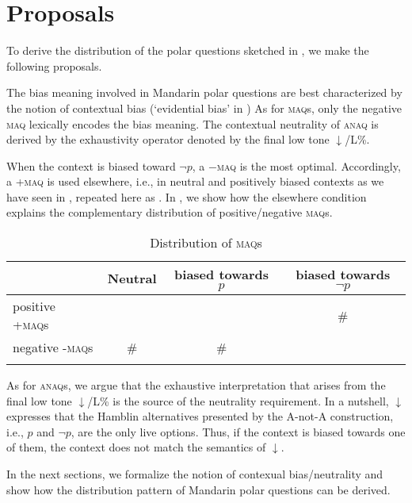 \documentclass[output=paper,colorlinks,citecolor=brown]{langscibook}
\begin{document}
\section{Proposals}

To derive the distribution of the polar questions sketched in , we make the following proposals.

\ea
\ea The bias meaning involved in Mandarin polar questions are best characterized by the notion of contextual bias (`evidential bias' in \citealt{Sudo})
	\ex As for \textsc{maq}s, only the negative \textsc{maq} lexically encodes the bias meaning.
	\ex The contextual neutrality of \textsc{anaq} is derived by the exhaustivity operator denoted by the final low tone $\downarrow$/L\%.
\z
\z




 When the context is biased toward $\neg p$, a  $-$\textsc{maq} is the most optimal.  Accordingly, a +\textsc{maq} is used  elsewhere, i.e., in neutral and positively biased contexts as we have seen in , repeated here as .  In , we show how the elsewhere condition  explains the complementary distribution of positive/negative \textsc{maq}s.


\begin{table}
	\begin{tabularx}{\textwidth}{lCCc}
	\lsptoprule
		&  Neutral  & biased towards  $p$ & biased towards $\neg p$\\
	\midrule
		positive +\textsc{maq}s & \cmark & \cmark & \#\\
		negative -\textsc{maq}s & \# & \# & \cmark\\
\lspbottomrule
	\end{tabularx}
\caption{Distribution of \textsc{maq}s}
\label{maqtab2}
\end{table}
	
	
As for \textsc{anaq}s, we argue that the exhaustive interpretation that arises from the final low tone $\downarrow$/L\% is the source of the neutrality requirement.  In a nutshell,  $\downarrow$ expresses that the Hamblin alternatives presented by the A-not-A construction, i.e., $p$ and  $\neg p$, are the only live options.  Thus, if the context is biased towards one of them, the context does not match the semantics of  $\downarrow$.
	
In the next sections, we formalize the notion of contexual bias/neutrality and show how the distribution pattern of Mandarin polar questions can be derived.
\end{document}
